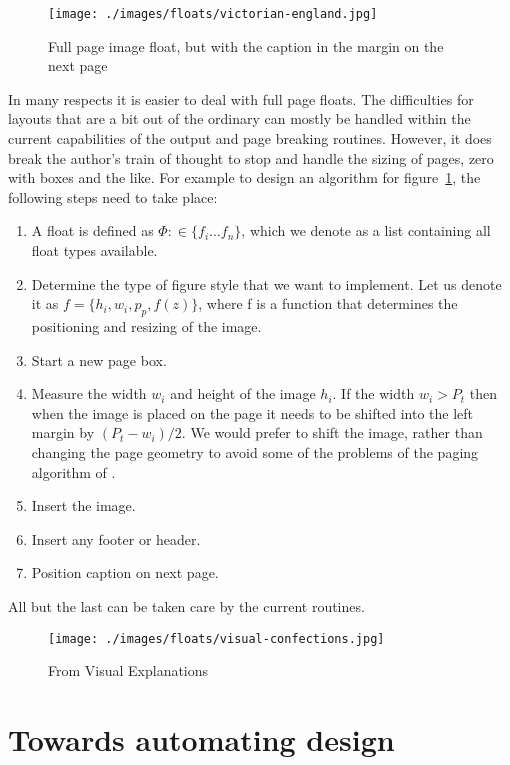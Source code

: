 \begin{figure}[hbt]
\texttt{[image: ./images/floats/victorian-england.jpg]}
\caption{Full page image float, but with the caption in the margin on the next page}
\label{fig:victorian}
\end{figure}

In many respects it is easier to deal with full page floats. The difficulties for layouts that are a bit out of the ordinary can mostly be handled within the current capabilities of the \latexe output and page breaking routines. However, it does break the author’s train of thought to stop and handle the sizing of pages, zero with boxes and the like. For example to design an algorithm for figure~\ref{fig:victorian}, the following steps need to take place:

\begin{enumerate}
\item  A float is defined as $\Phi \colon \in \{f_i\dots f_n \}$, which we denote as a list containing all float types available. 
\item Determine the type of figure style that we want to implement. Let us denote it as 
         $f = \{h_i,w_i,p_p, f(z)\}$, where f is a function that determines the positioning and resizing of the image.
\item Start a new page box.
\item Measure the width $w_i$  and height of the image $h_i$. If the width $w_i>P_t$ then when the image is placed on the page it needs to be shifted into the left margin by $(P_t-w_i)/2$. We would prefer to shift the image, rather than changing the page geometry to avoid some of the problems of the paging algorithm of \tex. 
\item Insert the image.
\item Insert any footer or header. 
\item Position caption on next page.          
\end{enumerate}

All but the last can be taken care by the current \latexe routines. 

\begin{figure}[htbp]
\texttt{[image: ./images/floats/visual-confections.jpg]}
\caption{From Visual Explanations}
\end{figure}


\section{Towards automating design}

